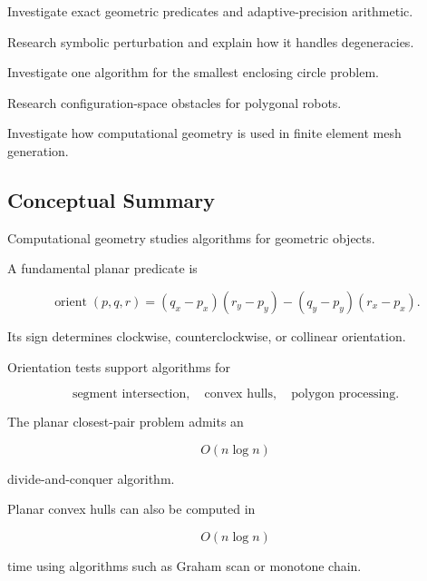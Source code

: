 \begin{exercise}[4]
Investigate exact geometric predicates and adaptive-precision arithmetic.
\end{exercise}

\begin{exercise}[4]
Research symbolic perturbation and explain how it handles degeneracies.
\end{exercise}

\begin{exercise}[4]
Investigate one algorithm for the smallest enclosing circle problem.
\end{exercise}

\begin{exercise}[4]
Research configuration-space obstacles for polygonal robots.
\end{exercise}

\begin{exercise}[4]
Investigate how computational geometry is used in finite element mesh
generation.
\end{exercise}

\subsection{Conceptual Summary}
\label{subsec:computational-geometry-summary}

Computational geometry studies algorithms for geometric objects.

A fundamental planar predicate is

\[
\boxed{
\operatorname{orient}(p,q,r)
=
(q_x-p_x)(r_y-p_y)
-
(q_y-p_y)(r_x-p_x).
}
\]

Its sign determines clockwise, counterclockwise, or collinear orientation.

Orientation tests support algorithms for

\[
\boxed{
\text{segment intersection},
\quad
\text{convex hulls},
\quad
\text{polygon processing}.
}
\]

The planar closest-pair problem admits an

\[
\boxed{
O(n\log n)
}
\]

divide-and-conquer algorithm.

Planar convex hulls can also be computed in

\[
\boxed{
O(n\log n)
}
\]

time using algorithms such as Graham scan or monotone chain.

